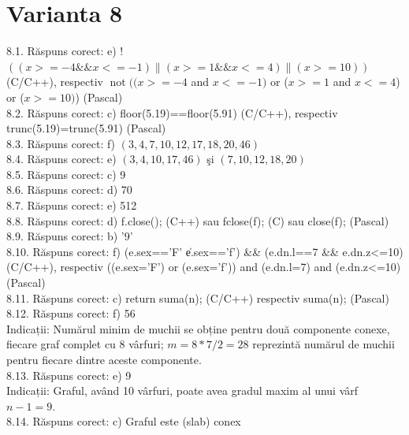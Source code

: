 \section*{Varianta 8}

8.1. Răspuns corect: e) !$((x>=-4 \&\& x<=-1)\|(x>=1 \& \& x<=4)\|(x>=10))$ (C/C++), respectiv $\operatorname{not}((x>=-4$ and $x<=-1)$ or ($x>=1$ and $x<=4$) or ($x>=10)$) (Pascal)\\

8.2. Răspuns corect: c) floor(5.19)==floor(5.91) (C/C++), respectiv trunc(5.19)=trunc(5.91) (Pascal)\\

8.3. Răspuns corect: f) $(3,4,7,10,12,17,18,20,46)$\\

8.4. Răspuns corect: e) $(3,4,10,17,46)$ şi $(7,10,12,18,20)$\\

8.5. Răspuns corect: c) 9\\

8.6. Răspuns corect: d) 70\\

8.7. Răspuns corect: e) 512\\

8.8. Răspuns corect: d) f.close(); (C++) sau fclose(f); (C) sau close(f); (Pascal)\\

8.9. Răspuns corect: b) '9'\\

8.10. Răspuns corect: f) (e.sex=='F' \| e.sex=='f') \&\& (e.dn.l==7 \&\& e.dn.z<=10) (C/C++), respectiv ((e.sex='F') or (e.sex='f')) and (e.dn.l=7) and (e.dn.z<=10) (Pascal)\\

8.11. Răspuns corect: c) return suma(n); (C/C++) respectiv suma(n); (Pascal)\\

8.12. Răspuns corect: f) 56\\
Indicații: Numărul minim de muchii se obține pentru două componente conexe, fiecare graf complet cu 8 vârfuri; $m=8 * 7 / 2=28$ reprezintă numărul de muchii pentru fiecare dintre aceste componente.\\

8.13. Răspuns corect: e) 9\\
Indicații: Graful, având 10 vârfuri, poate avea gradul maxim al unui vârf $n-1=9$.\\

8.14. Răspuns corect: c) Graful este (slab) conex\\

